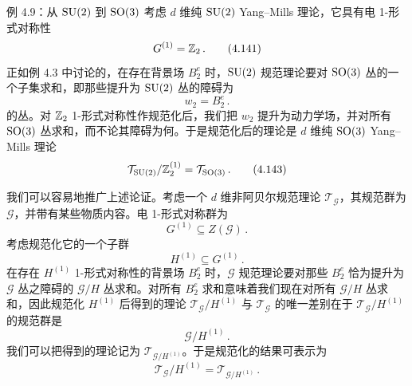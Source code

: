 \begin{examplebox}{例 4.9：从 $\mathrm{SU}(2)$ 到 $\mathrm{SO}(3)$}
考虑 $d$ 维纯 $\mathrm{SU}(2)$ Yang--Mills 理论，它具有电 1-形式对称性
\begin{equation}
G^{(1)}=\mathbb{Z}_2\,.
\tag{4.141}
\end{equation}
正如例 4.3 中讨论的，在存在背景场 $B_2^e$ 时，$\mathrm{SU}(2)$ 规范理论要对 $\mathrm{SO}(3)$ 丛的一个子集求和，即那些提升为 $\mathrm{SU}(2)$ 丛的障碍为
\begin{equation}
w_2=B_2^e\,.
\tag{4.142}
\end{equation}
的丛。对 $\mathbb{Z}_2$ 1-形式对称性作规范化后，我们把 $w_2$ 提升为动力学场，并对所有 $\mathrm{SO}(3)$ 丛求和，而不论其障碍为何。于是规范化后的理论是 $d$ 维纯 $\mathrm{SO}(3)$ Yang--Mills 理论
\begin{equation}
\mathcal{T}_{\mathrm{SU}(2)}/\mathbb{Z}_2^{(1)}=\mathcal{T}_{\mathrm{SO}(3)}\,.
\tag{4.143}
\end{equation}
\end{examplebox}

我们可以容易地推广上述论证。考虑一个 $d$ 维非阿贝尔规范理论 $\mathcal{T}_{\mathcal{G}}$，其规范群为 $\mathcal{G}$，并带有某些物质内容。电 1-形式对称群为
\begin{equation}
G^{(1)}\subseteq Z(\mathcal{G})\,.
\tag{4.144}
\end{equation}
考虑规范化它的一个子群
\begin{equation}
H^{(1)}\subseteq G^{(1)}\,.
\tag{4.145}
\end{equation}
在存在 $H^{(1)}$ 1-形式对称性的背景场 $B_2^e$ 时，$\mathcal{G}$ 规范理论要对那些 $B_2^e$ 恰为提升为 $\mathcal{G}$ 丛之障碍的 $\mathcal{G}/H$ 丛求和。对所有 $B_2^e$ 求和意味着我们现在对所有 $\mathcal{G}/H$ 丛求和，因此规范化 $H^{(1)}$ 后得到的理论 $\mathcal{T}_{\mathcal{G}}/H^{(1)}$ 与 $\mathcal{T}_{\mathcal{G}}$ 的唯一差别在于 $\mathcal{T}_{\mathcal{G}}/H^{(1)}$ 的规范群是
\begin{equation}
\mathcal{G}/H^{(1)}\,.
\tag{4.146}
\end{equation}
我们可以把得到的理论记为 $\mathcal{T}_{\mathcal{G}/H^{(1)}}$。于是规范化的结果可表示为
\begin{equation}
\mathcal{T}_{\mathcal{G}}/H^{(1)}=\mathcal{T}_{\mathcal{G}/H^{(1)}}\,.
\tag{4.147}
\end{equation}



